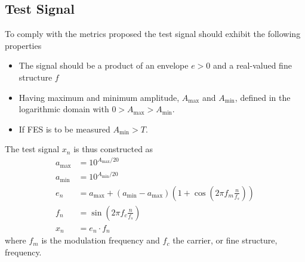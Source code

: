 \documentclass[../main2.tex]{subfiles}
\begin{document}
\subsection{Test Signal} \label{test_signal}
To comply with the metrics proposed the test signal should exhibit the following properties
\begin{itemize}
\item{The signal should be a product of an envelope $e > 0$ and a real-valued fine structure $f$}
\item{Having maximum and minimum amplitude, $A_\text{max}$ and  $A_\text{min}$, defined in the logarithmic domain with $0 > A_\text{max} > A_\text{min}$.}
\item{If FES is to be measured $A_\text{min} > T$.}
\end{itemize}

The test signal $x_n$ is thus constructed as
\begin{align}
a_\text{max} &= 10^{A_\text{max}/20} \\
a_\text{min} &= 10^{A_\text{min}/20} \\
e_n &=  a_\text{max} +  (a_\text{min}  - a_\text{max} )\left(1+\cos \left(2\pi f_m \frac{n}{f_s}\right)\right)\\
f_n &= \sin \left( 2\pi f_c\frac{n}{f_s}\right) \\
x_n &= e_n \cdot f_n
\end{align}
where $f_m$ is the modulation frequency and $f_c$ the carrier, or fine structure, frequency.
\end{document}
